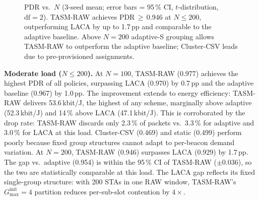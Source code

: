 \documentclass[conference]{IEEEtran}
\begin{document}
\begin{figure}[!t]
\caption{PDR vs.\ $N$ (3-seed mean; error bars = 95\,\% CI, $t$-distribution,
  $\mathrm{df}\!=\!2$).
  TASM-RAW achieves PDR\,$\geq$\,0.946 at $N\!\leq\!200$, outperforming
  LACA by up to 1.7\,pp and comparable to the adaptive baseline.
  Above $N\!=\!200$ adaptive-S grouping allows TASM-RAW to outperform the
  adaptive baseline; Cluster-CSV leads due to pre-provisioned assignments.}
\label{fig:pdr}
\end{figure}

\textbf{Moderate load ($N\!\leq\!200$).}
At $N\!=\!100$, TASM-RAW (0.977) achieves the highest PDR of all policies,
surpassing LACA (0.970) by 0.7\,pp and the adaptive baseline (0.967) by 1.0\,pp.
The improvement extends to energy efficiency: TASM-RAW delivers 53.6\,kbit/J,
the highest of any scheme, marginally above adaptive (52.3\,kbit/J) and 14\,\%
above LACA (47.1\,kbit/J).
This is corroborated by the drop rate: TASM-RAW discards only 2.3\,\% of
packets vs.\ 3.3\,\% for adaptive and 3.0\,\% for LACA at this load.
Cluster-CSV (0.469) and static (0.499) perform poorly because fixed group
structures cannot adapt to per-beacon demand variation.
At $N\!=\!200$, TASM-RAW (0.946) surpasses LACA (0.929) by 1.7\,pp.
The gap vs.\ adaptive (0.954) is within the 95\,\% CI of TASM-RAW ($\pm$0.036),
so the two are statistically comparable at this load.
The LACA gap reflects its fixed single-group structure: with 200 STAs in one
RAW window, TASM-RAW's $G_\mathrm{max}^\mathrm{init}\!=\!4$ partition
reduces per-sub-slot contention by $4\times$.
\end{document}
